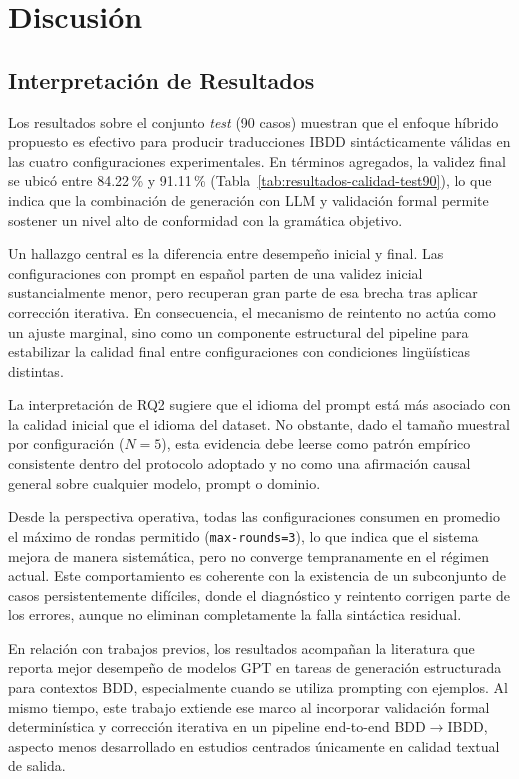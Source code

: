 \chapter{Discusión}

\section{Interpretación de Resultados}

Los resultados sobre el conjunto \textit{test} (90 casos) muestran que el enfoque híbrido propuesto es efectivo para producir traducciones IBDD sintácticamente válidas en las cuatro configuraciones experimentales. En términos agregados, la validez final se ubicó entre 84.22\,\% y 91.11\,\% (Tabla~\ref{tab:resultados-calidad-test90}), lo que indica que la combinación de generación con LLM y validación formal permite sostener un nivel alto de conformidad con la gramática objetivo.

Un hallazgo central es la diferencia entre desempeño inicial y final. Las configuraciones con prompt en español parten de una validez inicial sustancialmente menor, pero recuperan gran parte de esa brecha tras aplicar corrección iterativa. En consecuencia, el mecanismo de reintento no actúa como un ajuste marginal, sino como un componente estructural del pipeline para estabilizar la calidad final entre configuraciones con condiciones lingüísticas distintas.

La interpretación de RQ2 sugiere que el idioma del prompt está más asociado con la calidad inicial que el idioma del dataset. No obstante, dado el tamaño muestral por configuración ($N=5$), esta evidencia debe leerse como patrón empírico consistente dentro del protocolo adoptado y no como una afirmación causal general sobre cualquier modelo, prompt o dominio.

Desde la perspectiva operativa, todas las configuraciones consumen en promedio el máximo de rondas permitido (\texttt{max-rounds=3}), lo que indica que el sistema mejora de manera sistemática, pero no converge tempranamente en el régimen actual. Este comportamiento es coherente con la existencia de un subconjunto de casos persistentemente difíciles, donde el diagnóstico y reintento corrigen parte de los errores, aunque no eliminan completamente la falla sintáctica residual.

En relación con trabajos previos, los resultados acompañan la literatura que reporta mejor desempeño de modelos GPT en tareas de generación estructurada para contextos BDD, especialmente cuando se utiliza prompting con ejemplos. Al mismo tiempo, este trabajo extiende ese marco al incorporar validación formal determinística y corrección iterativa en un pipeline end-to-end BDD$\rightarrow$IBDD, aspecto menos desarrollado en estudios centrados únicamente en calidad textual de salida.

